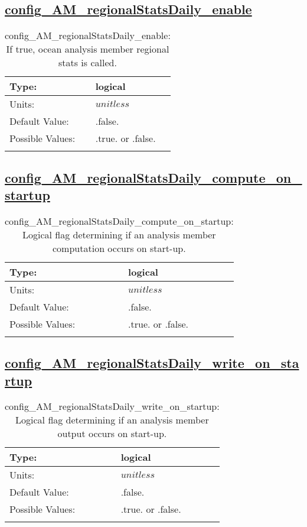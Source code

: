 \subsection[config\_AM\_regionalStatsDaily\_enable]{\hyperref[sec:nm_tab_AM_regionalStatsDaily]{config\_AM\_regionalStatsDaily\_enable}}
\label{subsec:nm_sec_config_AM_regionalStatsDaily_enable}
\begin{center}
\begin{longtable}{| p{2.0in} || p{4.0in} |}
    \hline
    Type: & logical \\
    \hline
    Units: & $unitless$ \\
    \hline
    Default Value: & .false. \\
    \hline
    Possible Values: & .true. or .false. \\
    \hline
    \caption{config\_AM\_regionalStatsDaily\_enable: If true, ocean analysis member regional stats is called.}
\end{longtable}
\end{center}
\subsection[config\_AM\_regionalStatsDaily\_compute\_on\_startup]{\hyperref[sec:nm_tab_AM_regionalStatsDaily]{config\_AM\_regionalStatsDaily\_compute\_on\_startup}}
\label{subsec:nm_sec_config_AM_regionalStatsDaily_compute_on_startup}
\begin{center}
\begin{longtable}{| p{2.0in} || p{4.0in} |}
    \hline
    Type: & logical \\
    \hline
    Units: & $unitless$ \\
    \hline
    Default Value: & .false. \\
    \hline
    Possible Values: & .true. or .false. \\
    \hline
    \caption{config\_AM\_regionalStatsDaily\_compute\_on\_startup: Logical flag determining if an analysis member computation occurs on start-up.}
\end{longtable}
\end{center}
\subsection[config\_AM\_regionalStatsDaily\_write\_on\_startup]{\hyperref[sec:nm_tab_AM_regionalStatsDaily]{config\_AM\_regionalStatsDaily\_write\_on\_startup}}
\label{subsec:nm_sec_config_AM_regionalStatsDaily_write_on_startup}
\begin{center}
\begin{longtable}{| p{2.0in} || p{4.0in} |}
    \hline
    Type: & logical \\
    \hline
    Units: & $unitless$ \\
    \hline
    Default Value: & .false. \\
    \hline
    Possible Values: & .true. or .false. \\
    \hline
    \caption{config\_AM\_regionalStatsDaily\_write\_on\_startup: Logical flag determining if an analysis member output occurs on start-up.}
\end{longtable}
\end{center}
